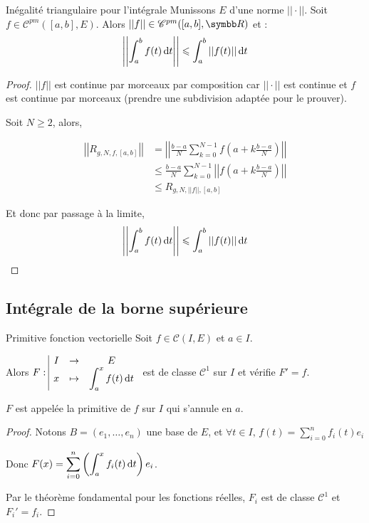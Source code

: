\begin{theoreme}{Inégalité triangulaire pour l'intégrale}{}
    Munissons $E$ d'une norme $||\cdot||$. Soit $f \in \mathscr C^{pm}([a, b], E)$.
    Alors $||f|| \in \mathscr C^{pm}([a, b], \R)$ et :
    \[\left|\left| \int_a^b f(t) \,\mathrm{d}t \right|\right| \leqslant \int_a^b ||f(t)|| \,\mathrm{d}t\]
\end{theoreme}


\begin{proof}
    $||f||$ est continue par morceaux par composition car $||\cdot||$ est continue
    et $f$ est continue par morceaux (prendre une subdivision adaptée pour le prouver).

    Soit $N \geqslant 2$, alors,

    \begin{align*}
        \left|\left| R_{g, N, f, [a, b]} \right|\right| & = \left|\left| \frac{b-a}{N} \sum_{k=0}^{N-1} f\left( a + k \frac{b-a}{N} \right) \right|\right| \\
        & \leqslant \frac{b-a}{N} \sum_{k=0}^{N-1} \left|\left| f\left( a + k \frac{b-a}{N} \right) \right|\right| \\
        & \leqslant R_{g, N, ||f||, [a, b]}
    \end{align*}

    Et donc par passage à la limite, 
    \[\left|\left| \int_a^b f(t) \,\mathrm{d}t \right|\right| \leqslant \int_a^b ||f(t)|| \,\mathrm{d}t\]
\end{proof}

\subsection{Intégrale de la borne supérieure}

\begin{theoreme}{Primitive fonction vectorielle}{}
    Soit $f \in \mathscr C(I, E)$ et $a \in I$. 

    Alors $F: \space \begin{array}{|ccc} \displaystyle I & \to & \displaystyle E \\ \displaystyle x & \mapsto & \displaystyle \int_a^x f(t) \,\mathrm{d}t \end{array}$ est de classe $\mathscr C^1$ sur $I$ et 
    vérifie $F' = f$.

    $F$ est appelée la primitive de $f$ sur $I$ qui s'annule en $a$. 
\end{theoreme}


\begin{proof}
    Notons $B = (e_1, \ldots, e_n)$ une base de $E$, et $\forall t \in I, \, f(t) \displaystyle = \sum_{i = 0 }^{ n } f_i(t) e_i$

    Donc $\displaystyle F(x) = \sum_{i = 0 }^{ n } \left( \int_a^x f_i(t) \,\mathrm{d}t \right) e_i$.

    Par le théorème fondamental pour les fonctions réelles, $F_i$ est de classe $\mathscr C^1$ et $F_i' = f_i$.
\end{proof}

